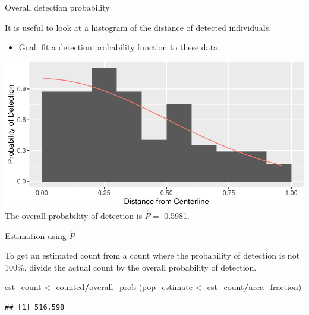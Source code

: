 \documentclass[
  ignorenonframetext,
]{beamer}
\newenvironment{Shaded}{\begin{snugshade}}{\end{snugshade}}
\newcommand{\NormalTok}[1]{#1}
\newcommand{\OperatorTok}[1]{\textcolor[rgb]{0.81,0.36,0.00}{\textbf{#1}}}
\newcommand{\StringTok}[1]{\textcolor[rgb]{0.31,0.60,0.02}{#1}}
\providecommand{\tightlist}{%
  \setlength{\itemsep}{0pt}\setlength{\parskip}{0pt}}
\begin{document}
\begin{frame}{Overall detection probability}
\protect\hypertarget{overall-detection-probability}{}

It is useful to look at a histogram of the distance of detected
individuals.

\begin{itemize}
\tightlist
\item
  Goal: fit a detection probability function to these data.
\end{itemize}

\includegraphics{distance_sampling_files/figure-beamer/unnamed-chunk-12-1.pdf}
The overall probability of detection is \(\hat P=\) 0.5981.

\end{frame}

\begin{frame}[fragile]{Estimation using \(\hat P\)}
\protect\hypertarget{estimation-using-hat-p}{}

To get an estimated count from a count where the probability of
detection is not 100\%, divide the actual count by the overall
probability of detection.

\scriptsize

\begin{Shaded}
\begin{Highlighting}[]
\NormalTok{est_count <-}\StringTok{ }\NormalTok{counted}\OperatorTok{/}\NormalTok{overall_prob}
\NormalTok{(pop_estimate <-}\StringTok{ }\NormalTok{est_count}\OperatorTok{/}\NormalTok{area_fraction)}
\end{Highlighting}
\end{Shaded}

\begin{verbatim}
## [1] 516.598
\end{verbatim}

\end{frame}
\end{document}
